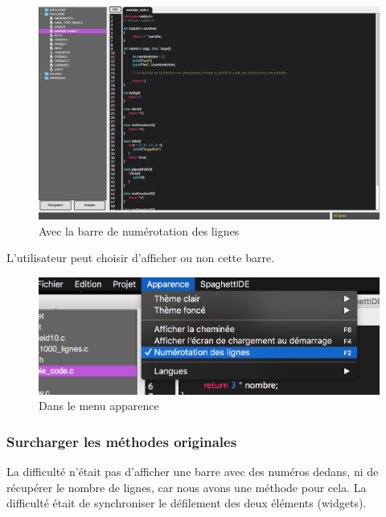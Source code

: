 \documentclass[a4paper,12pt]{article}
\begin{document}
		\begin{figure}[h!]
			\begin{center}
				\includegraphics[scale=0.3]{images/imgs_lines/apres}
				\caption{Avec la barre de numérotation des lignes}
			\end{center}
		\end{figure}
		
		\newpage
		
	L'utilisateur peut choisir d'afficher ou non cette barre.
	
		\begin{figure}[h!]
			\begin{center}
				\includegraphics[scale=0.8]{images/imgs_lines/menu}
				\caption{Dans le menu apparence}
			\end{center}
		\end{figure}
		
		\subsubsection{Surcharger les méthodes originales}

	La difficulté n'était pas d'afficher une barre avec des numéros dedans, ni de récupérer le nombre de lignes, car nous avons une méthode pour cela. La difficulté était de synchroniser le défilement des deux éléments (widgets).\\
		
\end{document}
